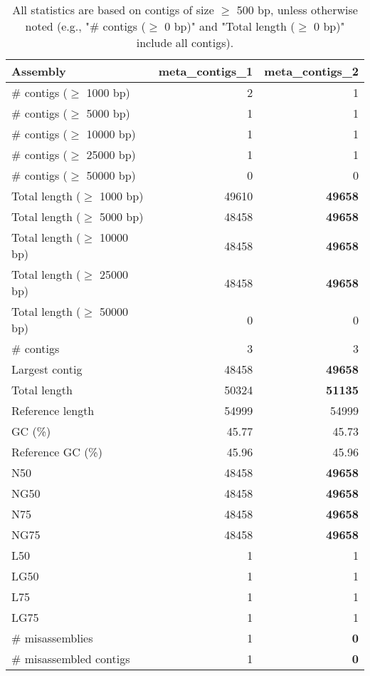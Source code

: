 \documentclass[12pt,a4paper]{article}
\begin{document}
\begin{table}[ht]
\begin{center}
\caption{All statistics are based on contigs of size $\geq$ 500 bp, unless otherwise noted (e.g., "\# contigs ($\geq$ 0 bp)" and "Total length ($\geq$ 0 bp)" include all contigs).}
\begin{tabular}{|l*{2}{|r}|}
\hline
Assembly & meta\_contigs\_1 & meta\_contigs\_2 \\ \hline
\# contigs ($\geq$ 1000 bp) & 2 & 1 \\ \hline
\# contigs ($\geq$ 5000 bp) & 1 & 1 \\ \hline
\# contigs ($\geq$ 10000 bp) & 1 & 1 \\ \hline
\# contigs ($\geq$ 25000 bp) & 1 & 1 \\ \hline
\# contigs ($\geq$ 50000 bp) & 0 & 0 \\ \hline
Total length ($\geq$ 1000 bp) & 49610 & {\bf 49658} \\ \hline
Total length ($\geq$ 5000 bp) & 48458 & {\bf 49658} \\ \hline
Total length ($\geq$ 10000 bp) & 48458 & {\bf 49658} \\ \hline
Total length ($\geq$ 25000 bp) & 48458 & {\bf 49658} \\ \hline
Total length ($\geq$ 50000 bp) & 0 & 0 \\ \hline
\# contigs & 3 & 3 \\ \hline
Largest contig & 48458 & {\bf 49658} \\ \hline
Total length & 50324 & {\bf 51135} \\ \hline
Reference length & 54999 & 54999 \\ \hline
GC (\%) & 45.77 & 45.73 \\ \hline
Reference GC (\%) & 45.96 & 45.96 \\ \hline
N50 & 48458 & {\bf 49658} \\ \hline
NG50 & 48458 & {\bf 49658} \\ \hline
N75 & 48458 & {\bf 49658} \\ \hline
NG75 & 48458 & {\bf 49658} \\ \hline
L50 & 1 & 1 \\ \hline
LG50 & 1 & 1 \\ \hline
L75 & 1 & 1 \\ \hline
LG75 & 1 & 1 \\ \hline
\# misassemblies & 1 & {\bf 0} \\ \hline
\# misassembled contigs & 1 & {\bf 0} \\ \hline

\end{tabular}
\end{center}
\end{table}
\end{document}
